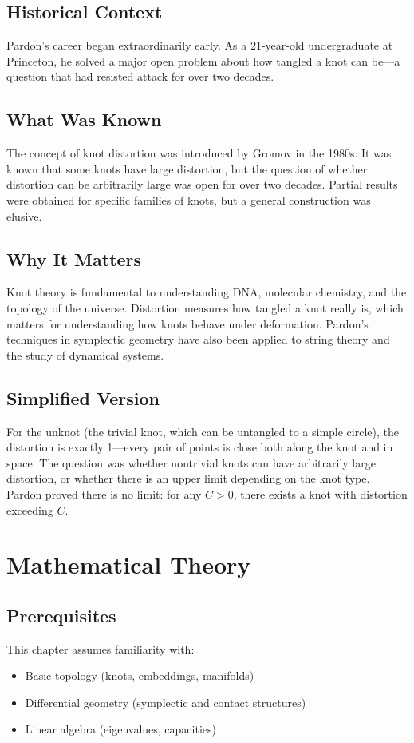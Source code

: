 \subsection{Historical Context}
Pardon's career began extraordinarily early. As a 21-year-old undergraduate at Princeton, he solved a major open problem about how tangled a knot can be---a question that had resisted attack for over two decades.

\subsection{What Was Known}
The concept of knot distortion was introduced by Gromov in the 1980s. It was known that some knots have large distortion, but the question of whether distortion can be arbitrarily large was open for over two decades. Partial results were obtained for specific families of knots, but a general construction was elusive.

\subsection{Why It Matters}
Knot theory is fundamental to understanding DNA, molecular chemistry, and the topology of the universe. Distortion measures how tangled a knot really is, which matters for understanding how knots behave under deformation. Pardon's techniques in symplectic geometry have also been applied to string theory and the study of dynamical systems.

\subsection{Simplified Version}
For the unknot (the trivial knot, which can be untangled to a simple circle), the distortion is exactly 1---every pair of points is close both along the knot and in space. The question was whether nontrivial knots can have arbitrarily large distortion, or whether there is an upper limit depending on the knot type. Pardon proved there is no limit: for any $C > 0$, there exists a knot with distortion exceeding $C$.

\section{Mathematical Theory}

\subsection{Prerequisites}
This chapter assumes familiarity with:
\begin{itemize}
\item Basic topology (knots, embeddings, manifolds)
\item Differential geometry (symplectic and contact structures)
\item Linear algebra (eigenvalues, capacities)
\end{itemize}

